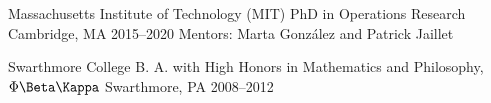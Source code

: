 

\begin{cventries}

\cventry
{Massachusetts Institute of Technology (MIT)} %
  {PhD in Operations Research} %
  {Cambridge, MA} %
  {2015--2020} %
  {Mentors: Marta Gonz\'{a}lez and Patrick Jaillet}

  \cventry
  {Swarthmore College} %
    {B. A. with High Honors in Mathematics and Philosophy, $\Phi\Beta\Kappa$} %
    {Swarthmore, PA} %
    {2008--2012} %
    {}  

\end{cventries}
